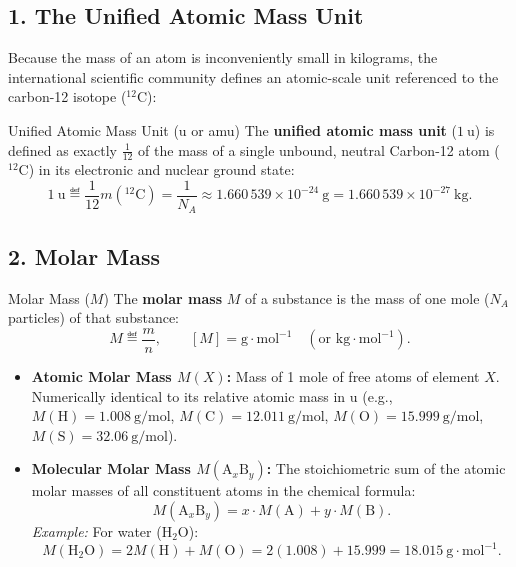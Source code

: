 \subsection{1. The Unified Atomic Mass Unit}
Because the mass of an atom is inconveniently small in kilograms, the international scientific community defines an atomic-scale unit referenced to the carbon-12 isotope ($^{12}\mathrm{C}$):

\begin{definitionbox}{Unified Atomic Mass Unit (u or amu)}
The \textbf{unified atomic mass unit} ($1\ \mathrm{u}$) is defined as exactly $\frac{1}{12}$ of the mass of a single unbound, neutral Carbon-12 atom ($^{12}\mathrm{C}$) in its electronic and nuclear ground state:
\begin{equation}
1\ \mathrm{u} \eqdef \frac{1}{12} m(^{12}\mathrm{C}) = \frac{1}{N_A} \approx 1.660\,539 \times 10^{-24}\ \mathrm{g} = 1.660\,539 \times 10^{-27}\ \mathrm{kg}.
\end{equation}
\end{definitionbox}

\subsection{2. Molar Mass}
\begin{definitionbox}{Molar Mass ($M$)}
The \textbf{molar mass} $M$ of a substance is the mass of one mole ($N_A$ particles) of that substance:
\begin{equation}
M \eqdef \frac{m}{n}, \qquad [M] = \mathrm{g\cdot mol^{-1}} \quad (\text{or } \mathrm{kg\cdot mol^{-1}}).
\end{equation}
\begin{itemize}[leftmargin=1.5em,itemsep=2pt]
  \item \textbf{Atomic Molar Mass $M(X)$:} Mass of 1 mole of free atoms of element $X$. Numerically identical to its relative atomic mass in $\mathrm{u}$ (e.g., $M(\mathrm{H}) = 1.008\ \mathrm{g/mol}$, $M(\mathrm{C}) = 12.011\ \mathrm{g/mol}$, $M(\mathrm{O}) = 15.999\ \mathrm{g/mol}$, $M(\mathrm{S}) = 32.06\ \mathrm{g/mol}$).
  \item \textbf{Molecular Molar Mass $M(\mathrm{A}_x \mathrm{B}_y)$:} The stoichiometric sum of the atomic molar masses of all constituent atoms in the chemical formula:
  \begin{equation}
  M(\mathrm{A}_x \mathrm{B}_y) = x \cdot M(\mathrm{A}) + y \cdot M(\mathrm{B}).
  \end{equation}
  \emph{Example:} For water ($\mathrm{H_2O}$):
  \[
  M(\mathrm{H_2O}) = 2 M(\mathrm{H}) + M(\mathrm{O}) = 2(1.008) + 15.999 = 18.015\ \mathrm{g\cdot mol^{-1}}.
  \]
\end{itemize}
\end{definitionbox}


